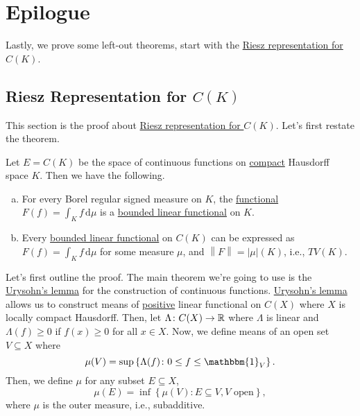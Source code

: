\chapter{Epilogue}
Lastly, we prove some left-out theorems, start with the \hyperref[thm:Riesz-representation-for-C-K]{Riesz representation for \(C(K)\)}.

\section{Riesz Representation for \(C(K)\)}\label{pf:Riesz-representation-for-C-K}
This section is the proof about \hyperref[thm:Riesz-representation-for-C-K]{Riesz representation for \(C(K)\)}. Let's first restate the theorem.

\begin{prev}
	Let \(E = C(K)\) be the space of continuous functions on \hyperref[def:compact]{compact} Hausdorff space \(K\). Then we have the following.
	\begin{enumerate}[(a)]
		\item For every Borel regular signed measure on \(K\), the \hyperref[def:linear-functional]{functional} \(F(f) = \int _K f\,\mathrm{d} \mu \) is a \hyperref[def:bounded-linear-functional]{bounded linear functional} on \(K\).
		\item Every \hyperref[def:bounded-linear-functional]{bounded linear functional} on \(C(K)\) can be expressed as \(F(f) = \int _K f\,\mathrm{d} \mu \) for some measure \(\mu \), and \(\left\lVert F\right\rVert = \left\vert \mu  \right\vert (K) \), i.e., \(TV(K)\).
	\end{enumerate}
\end{prev}
Let's first outline the proof. The main theorem we're going to use is the \href{https://en.wikipedia.org/wiki/Urysohn%27s_lemma}{Urysohn's lemma} for the construction of continuous functions. \href{https://en.wikipedia.org/wiki/Urysohn%27s_lemma}{Urysohn's lemma} allows us to construct means of \hyperref[def:positive-op]{positive} linear functional on \(C(X)\) where \(X\) is locally compact Hausdorff. Then, let \(\Lambda \colon C(X) \to \mathbb{\MakeUppercase{r}} \) where \(\Lambda \) is linear and \(\Lambda (f) \geq 0\) if \(f(x) \geq 0\) for all \(x\in X\). Now, we define means of an open set \(V \subseteq X\) where 
\[
	\mu (V) = \sup \left\{ \Lambda (f) \colon 0 \leq f \leq \mathbbm{1}_{V} \right\}.
\]
Then, we define \(\mu \) for any subset \(E \subseteq X\),
\[
	\mu (E) = \inf \left\{ \mu (V)\colon E \subseteq V, V \text{ open}  \right\},
\]
where \(\mu \) is the outer measure, i.e., subadditive.